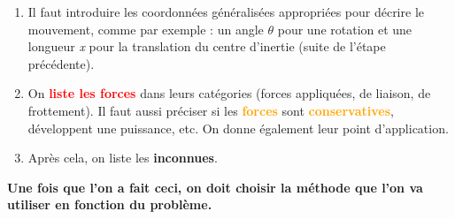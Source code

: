 \documentclass[a4paper]{article}
\begin{document}
\begin{enumerate}
\item Il faut introduire les coordonnées généralisées appropriées pour décrire le mouvement, comme par exemple : un angle $ \theta $ pour une rotation et une longueur \emph{x} pour la translation du centre d'inertie (suite de l'étape précédente).

\item On \textcolor{red}{\textbf{liste les forces}} dans leurs catégories (forces appliquées, de liaison, de frottement). Il faut aussi préciser si les \textcolor{orange}{\textbf{forces}} sont \textcolor{orange}{\textbf{conservatives}}, développent une puissance, etc. On donne également leur point d'application.

\item Après cela, on liste les \textbf{inconnues}.

\end{enumerate}





\begin{center} \textbf{Une fois que l'on a fait ceci, on doit choisir la méthode que l'on va utiliser en fonction du problème.} \end{center}
\end{document}
